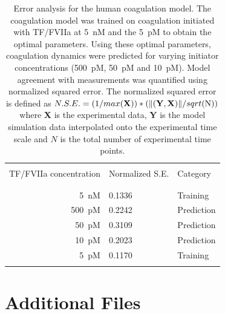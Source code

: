 \documentclass{bmcart}
\begin{document}
\begin{backmatter}
\begin{table}[h!]
\centering
\caption[.]{Error analysis for the human coagulation model. The coagulation model was trained on coagulation initiated with TF/FVIIa at 5~nM and the 5~pM to obtain the optimal parameters.
Using these optimal parameters, coagulation dynamics were predicted for varying initiator concentrations (500~pM, 50~pM and 10~pM).
Model agreement with measurements was quantified using normalized squared error. The normalized squared error is defined as \( N.S.E.=(1/max(\mathbf{X}))*(\lVert (\mathbf{Y},\mathbf{X}) \rVert /sqrt$(N)$) \) where \textbf{X} is the experimental data, \textbf{Y} is the model simulation data interpolated onto the experimental time scale and $N$ is the total number of experimental time points.}
\label{table:Error-Analysis}
\begin{center}
\begin{tabular}{ r|ll}
\hline\\
TF/FVIIa concentration& Normalized S.E.& Category\\\\
\hline\\
5~nM & 0.1336 & Training \\
500~pM & 0.2242 & Prediction\\
50~pM & 0.3109 & Prediction\\
10~pM & 0.2023 & Prediction\\
5~pM & 0.1170 & Training\\\\
\hline
\end{tabular}
\end{center}
\end{table}

\section*{Additional Files}
\setcounter{equation}{0}
\setcounter{table}{0}
\setcounter{figure}{0}
%

\end{backmatter}
\end{document}

